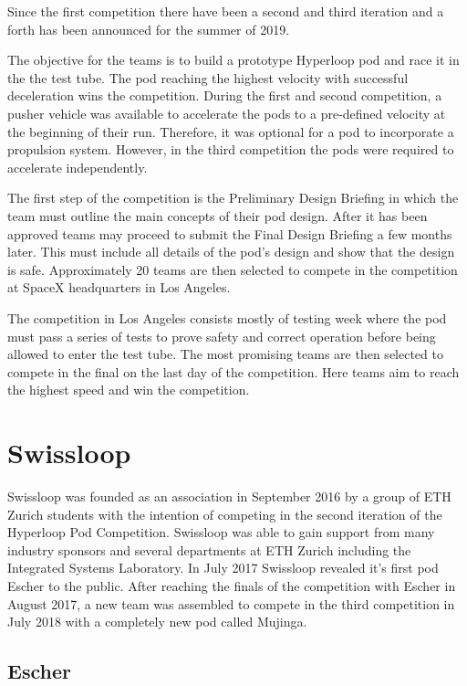
Since the first competition there have been a second and third iteration and a forth has been announced for the summer of 2019.

The objective for the teams is to build a prototype Hyperloop pod and race it in the the test tube. The pod reaching the highest velocity with successful deceleration wins the competition. During the first and second competition, a pusher vehicle was available to accelerate the pods to a pre-defined velocity at the beginning of their run. Therefore, it was optional for a pod to incorporate a propulsion system. However, in the third competition the pods were required to accelerate independently.

The first step of the competition is the Preliminary Design Briefing in which the team must outline the main concepts of their pod design. After it has been approved teams may proceed to submit the Final Design Briefing a few months later. This must include all details of the pod's design and show that the design is safe. Approximately 20 teams are then selected to compete in the competition at SpaceX headquarters in Los Angeles.

The competition in Los Angeles consists mostly of testing week where the pod must pass a series of tests to prove safety and correct operation before being allowed to enter the test tube. The most promising teams are then selected to compete in the final on the last day of the competition. Here teams aim to reach the highest speed and win the competition.

\section{Swissloop}

Swissloop was founded as an association in September 2016 by a group of ETH Zurich students with the intention of competing in the second iteration of the Hyperloop Pod Competition. Swissloop was able to gain support from many industry sponsors and several departments at ETH Zurich including the Integrated Systems Laboratory. In July 2017 Swissloop revealed it's first pod Escher to the public. After reaching the finals of the competition with Escher in August 2017, a new team was assembled to compete in the third competition in July 2018 with a completely new pod called Mujinga.

\subsection{Escher}

